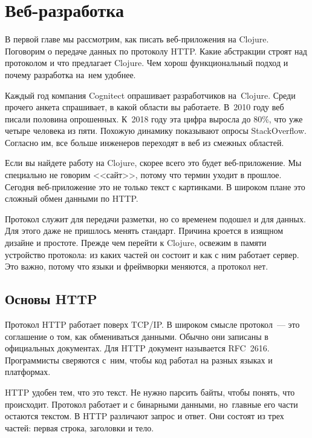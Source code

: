 \chapter{Веб-разработка}

\begin{teaser}
В первой главе мы рассмотрим, как писать веб-приложения на Clojure. Поговорим о
передаче данных по протоколу HTTP. Какие абстракции строят над протоколом и что
предлагает Clojure. Чем хорош функциональный подход и почему разработка на~нем
удобнее.
\end{teaser}

Каждый год компания Cognitect
опрашивает
разработчиков на~Clojure. Среди прочего анкета спрашивает, в какой области вы
работаете. В~2010 году веб писали половина опрошенных. К~2018 году эта цифра
выросла до 80\%, что уже четыре человека из пяти. Похожую динамику показывают
опросы StackOverflow. Согласно
им, все больше инженеров переходят в веб из смежных областей.

Если вы найдете работу на Clojure, скорее всего это будет веб-приложение. Мы
специально не говорим <<сайт>>, потому что термин уходит в прошлое. Сегодня
веб-приложение это не только текст с картинками. В широком плане это сложный
обмен данными по HTTP.

Протокол служит для передачи разметки, но со временем подошел и для данных. Для
этого даже не пришлось менять стандарт. Причина кроется в изящном дизайне и
простоте. Прежде чем перейти к Clojure, освежим в памяти устройство
протокола: из каких частей он состоит и как с ним работает сервер. Это важно,
потому что языки и фреймворки меняются, а протокол нет.

\section{Основы HTTP}

Протокол HTTP работает поверх TCP/IP. В широком смысле протокол~--- это
соглашение о том, как обмениваться данными. Обычно они записаны в официальных
документах. Для HTTP документ называется
RFC~2616. Программисты
сверяются с~ним, чтобы код работал на разных языках и платформах.

HTTP удобен тем, что это текст. Не нужно парсить байты, чтобы понять, что
происходит. Протокол работает и с бинарными данными, но~главные его части
остаются текстом. В HTTP различают запрос и ответ. Они состоят из трех частей:
первая строка, заголовки и тело.

